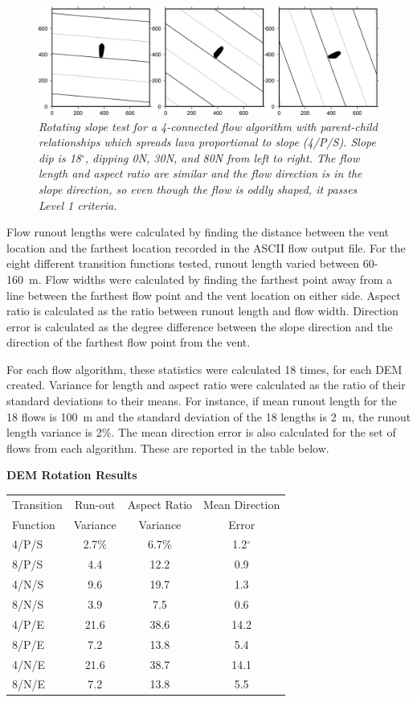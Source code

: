 \documentclass[12pt,letter]{article}
\begin{document}
	\begin{figure}[h!]
		\centering
		\includegraphics[width=\linewidth]{figures/lava_C_4N_slope}
		\caption{\textit{Rotating slope test for a 4-connected flow algorithm with parent-child relationships which spreads lava proportional to slope (4/P/S). Slope dip is 18$^{\circ}$, dipping 0N, 30N, and 80N from left to right. The flow length and aspect ratio are similar and the flow direction is in the slope direction, so even though the flow is oddly shaped, it passes Level 1 criteria.}}
		\label{fig:slope}
	\end{figure}
	
	Flow runout lengths were calculated by finding the distance between the vent location and the farthest location recorded in the ASCII flow output file. For the eight different transition functions tested, runout length varied between 60-160~m. Flow widths were calculated by finding the farthest point away from a line between the farthest flow point and the vent location on either side. Aspect ratio is calculated as the ratio between runout length and flow width. Direction error is calculated as the degree difference between the slope direction and the direction of the farthest flow point from the vent.
	
	For each flow algorithm, these statistics were calculated 18 times, for each DEM created. Variance for length and aspect ratio were calculated as the ratio of their standard deviations to their means. For instance, if mean runout length for the 18 flows is 100~m and the standard deviation of the 18 lengths is 2~m, the runout length variance is 2\%. The mean direction error is also calculated for the set of flows from each algorithm. These are reported in the table below.

		\begin{center}
			\textbf{DEM Rotation Results}
			\begin{tabular}{l c c c}
				\toprule
				Transition&Run-out&Aspect Ratio&Mean Direction\\
				Function&Variance&Variance&Error\\
				\midrule
				4/P/S &2.7\%&6.7\%&1.2$^{\circ}$\\
				8/P/S &4.4&12.2&0.9\\
				4/N/S &9.6&19.7&1.3\\
				8/N/S &3.9&7.5&0.6\\
				4/P/E &21.6&38.6&14.2\\
				8/P/E &7.2&13.8&5.4\\
				4/N/E &21.6&38.7&14.1\\
				8/N/E &7.2&13.8&5.5\\
				
				\bottomrule
			\end{tabular}
		\end{center}
		
\end{document}
